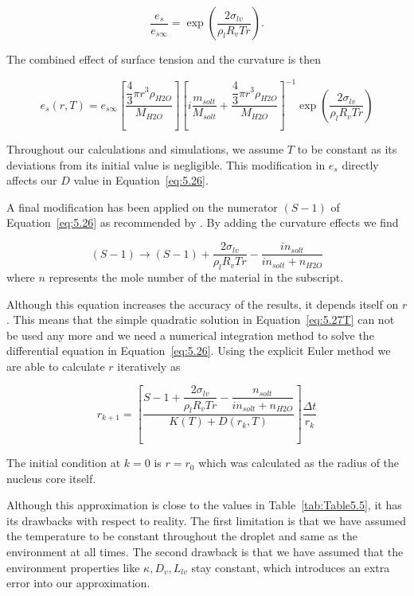 \documentclass[titlepage]{article}
\begin{document}
\begin{equation}
    \label{eq:Curvature}
    \dfrac{e_{s}}{e_{s\infty}}=\exp \left( \dfrac{2\sigma_{lv}}{\rho_{l}R_{v}Tr} \right) .
\end{equation}

The combined effect of surface tension and the curvature is then

\begin{equation}
    \label{eq:EsDefinition}
    e_{s}(r,T) = e_{s\infty} \left[ \dfrac{\dfrac{4}{3}\pi r^{3} \rho_{H2O}}{M_{H2O}} \right] \left[ i \dfrac{m_{solt}}{M_{solt}} + \dfrac{\dfrac{4}{3}\pi r^{3} \rho_{H2O}}{M_{H2O}} \right] ^{-1} \exp \left( \dfrac{2\sigma_{lv}}{\rho_{l}R_{v}Tr} \right)
\end{equation}

Throughout our calculations and simulations, we assume $T$ to be constant as
its deviations from its initial value is negligible. This modification in
$e_{s}$ directly affects our $D$ value in Equation~\eqref{eq:5.26}.


A final modification has been applied on the numerator $(S-1)$ of
Equation~\eqref{eq:5.26} as recommended by \cite{Mason}. By adding the
curvature effects we find

\begin{equation}
    \label{eq:Numerator}
    (S-1) \rightarrow (S-1)+\dfrac{2\sigma_{lv}}{\rho_{l}R_{v}Tr}-\dfrac{i n_{solt}}{i n_{solt}+n_{H2O}}
\end{equation}
where $n$ represents the mole number of the material in the subscript.


Although this equation increases the accuracy of the results, it depends itself
on $r$. This means that the simple quadratic solution in
Equation~\eqref{eq:5.27T} can not be used any more and we need a numerical
integration method to solve the differential equation in
Equation~\eqref{eq:5.26}. Using the explicit Euler method we are able to
calculate $r$ iteratively as

\begin{equation}
    \label{eq:Iteration}
    r_{k+1}= \left[ \dfrac{S - 1+\dfrac{2\sigma_{lv}}{\rho_{l}R_{v}Tr} - \dfrac{n_{solt}}{i n_{solt}+n_{H2O}}}{K(T) + D(r_{k},T)} \right] \dfrac{\Delta t}{r_{k}}
\end{equation}

The initial condition at $k=0$ is $r=r_0$ which was calculated as the radius
of the nucleus core itself.

Although this approximation is close to the values in Table~\ref{tab:Table5.5},
it has its drawbacks with respect to reality. The first limitation is that we
have assumed the temperature to be constant throughout the droplet and same as
the environment at all times. The second drawback is that we have assumed that
the environment properties like $\kappa, D_{v}, L_{lv}$ stay constant, which
introduces an extra error into our approximation.
\end{document}
